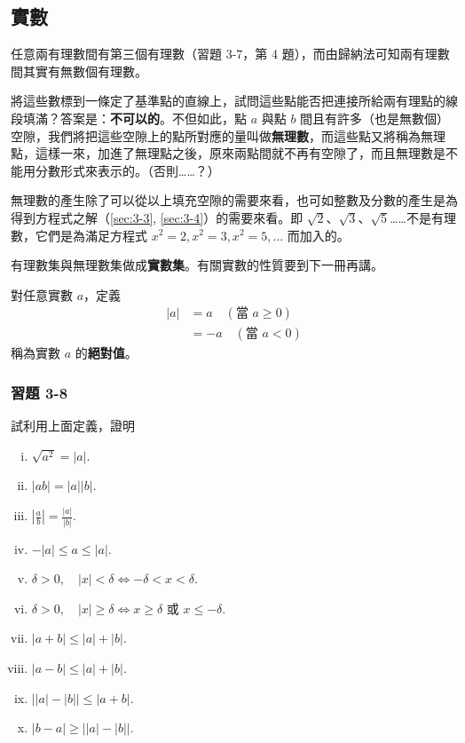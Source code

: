 \subsection{實數}\label{sec:3-5}

任意兩有理數間有第三個有理數（習題 3-7，第 4 題），而由歸納法可知兩有理數間其實有無數個有理數。

將這些數標到一條定了基準點的直線上，試問這些點能否把連接所給兩有理點的線段填滿？答案是：\textbf{不可以的}。不但如此，點 $a$ 與點 $b$ 間且有許多（也是無數個）空隙，我們將把這些空隙上的點所對應的量叫做\textbf{無理數}，而這些點又將稱為無理點，這樣一來，加進了無理點之後，原來兩點間就不再有空隙了，而且無理數是不能用分數形式來表示的。（否則……？）

無理數的產生除了可以從以上填充空隙的需要來看，也可如整數及分數的產生是為得到方程式之解（\ref{sec:3-3}, \ref{sec:3-4}）的需要來看。即 $\sqrt{2}$、$\sqrt{3}$、$\sqrt{5}$……不是有理數，它們是為滿足方程式 $x^2=2, x^2=3, x^2=5, \dots$ 而加入的。

有理數集與無理數集做成\textbf{實數集}。有關實數的性質要到下一冊再講。

對任意實數 $a$，定義
\begin{align*}
  |a| &= a \quad (\text{當 } a \ge 0) \\
  &= -a \quad (\text{當 } a < 0)
\end{align*}
稱為實數 $a$ 的\textbf{絕對值}。

\subsubsection*{習題 3-8}\label{sec:ex3-8}

試利用上面定義，證明
\begin{enumerate}[(i), leftmargin=2.5em]
  \item $\sqrt{a^2} = |a|$.
  \item $|ab| = |a||b|$.
  \item $\left|\frac{a}{b}\right| = \frac{|a|}{|b|}$.
  \item $-|a| \le a \le |a|$.
  \item $\delta > 0, \quad |x| < \delta \iff -\delta < x < \delta$.
  \item $\delta > 0, \quad |x| \ge \delta \iff x \ge \delta \text{ 或 } x \le -\delta$.
  \item $|a+b| \le |a| + |b|$.
  \item $|a-b| \le |a| + |b|$.
  \item $\big||a| - |b|\big| \le |a+b|$.
  \item $|b-a| \ge \big||a| - |b|\big|$.
\end{enumerate}

